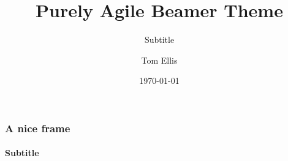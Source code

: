 \documentclass{beamer}
\title{Purely Agile Beamer Theme}
\subtitle{Subtitle}
\author{Tom Ellis}
\date{\today}
\begin{document}
\begin{frame}[t]
\titlepage
\end{frame}

\begin{frame}
\frametitle{A nice frame}
\framesubtitle{Subtitle}
\end{frame}
\end{document}
